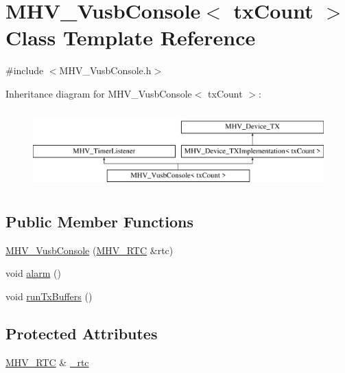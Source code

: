 \hypertarget{class_m_h_v___vusb_console}{\section{M\-H\-V\-\_\-\-Vusb\-Console$<$ tx\-Count $>$ Class Template Reference}
\label{class_m_h_v___vusb_console}
}


{\ttfamily \#include $<$M\-H\-V\-\_\-\-Vusb\-Console.\-h$>$}

Inheritance diagram for M\-H\-V\-\_\-\-Vusb\-Console$<$ tx\-Count $>$\-:\begin{figure}[H]
\begin{center}
\leavevmode
\includegraphics[height=3.000000cm]{class_m_h_v___vusb_console}
\end{center}
\end{figure}
\subsection*{Public Member Functions}
\begin{DoxyCompactItemize}
\item 
\hyperlink{class_m_h_v___vusb_console_aa6a5f04327aa776a06d789d2866cd393}{M\-H\-V\-\_\-\-Vusb\-Console} (\hyperlink{class_m_h_v___r_t_c}{M\-H\-V\-\_\-\-R\-T\-C} \&rtc)
\item 
void \hyperlink{class_m_h_v___vusb_console_a154e3655d7e43f106542c1532a51618f}{alarm} ()
\item 
void \hyperlink{class_m_h_v___vusb_console_ad1d333640c3d472717e9c6d7c9f6d3c8}{run\-Tx\-Buffers} ()
\end{DoxyCompactItemize}
\subsection*{Protected Attributes}
\begin{DoxyCompactItemize}
\item 
\hyperlink{class_m_h_v___r_t_c}{M\-H\-V\-\_\-\-R\-T\-C} \& \hyperlink{class_m_h_v___vusb_console_a0ae20702047c702e8bf950753874dff6}{\-\_\-rtc}
\end{DoxyCompactItemize}
